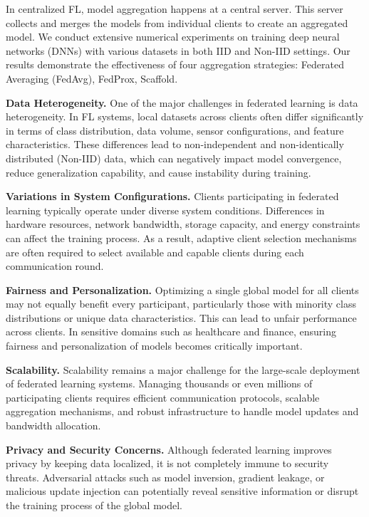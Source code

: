 \documentclass[12pt]{book}
\begin{document}
In centralized FL, model aggregation happens at a central server. This server collects and merges the models from individual clients to create an aggregated model. 
We conduct extensive numerical experiments on training deep neural networks (DNNs) with various datasets in both IID and Non-IID settings. Our results demonstrate the effectiveness of four aggregation strategies: Federated Averaging (FedAvg), FedProx, Scaffold.


\textbf{Data Heterogeneity.}  
One of the major challenges in federated learning is data heterogeneity. In FL systems, local datasets across clients often differ significantly in terms of class distribution, data volume, sensor configurations, and feature characteristics. These differences lead to non-independent and non-identically distributed (Non-IID) data, which can negatively impact model convergence, reduce generalization capability, and cause instability during training.

\textbf{Variations in System Configurations.}  
Clients participating in federated learning typically operate under diverse system conditions. Differences in hardware resources, network bandwidth, storage capacity, and energy constraints can affect the training process. As a result, adaptive client selection mechanisms are often required to select available and capable clients during each communication round.

\textbf{Fairness and Personalization.}  
Optimizing a single global model for all clients may not equally benefit every participant, particularly those with minority class distributions or unique data characteristics. This can lead to unfair performance across clients. In sensitive domains such as healthcare and finance, ensuring fairness and personalization of models becomes critically important.

\textbf{Scalability.}  
Scalability remains a major challenge for the large-scale deployment of federated learning systems. Managing thousands or even millions of participating clients requires efficient communication protocols, scalable aggregation mechanisms, and robust infrastructure to handle model updates and bandwidth allocation.

\textbf{Privacy and Security Concerns.}  
Although federated learning improves privacy by keeping data localized, it is not completely immune to security threats. Adversarial attacks such as model inversion, gradient leakage, or malicious update injection can potentially reveal sensitive information or disrupt the training process of the global model.
\end{document}

